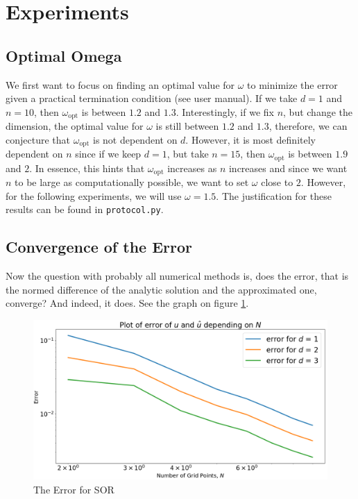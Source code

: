 \section{Experiments}
\subsection{Optimal Omega}

We first want to focus on finding an optimal value for \(\omega\) to minimize the error given a practical termination condition (see user manual). If we take \(d = 1\) and \(n = 10\), then \(\omega_{\text{opt}}\) is between \(1.2\) and \(1.3\). Interestingly, if we fix \(n\), but change the dimension, the optimal value for \(\omega\) is still between \(1.2\) and \(1.3\), therefore, we can conjecture that \(\omega_\text{opt}\) is not dependent on \(d\). However, it is most definitely dependent on \(n\) since if we keep \(d = 1\), but take \(n = 15\), then \(\omega_{\text{opt}}\) is between \(1.9\) and \(2\).
In essence, this hints that \(\omega_\text{opt}\) increases as \(n\) increases and since we want \(n\) to be large as computationally possible, we want to set \(\omega\) close to \(2\). However, for the following experiments, we will use \(\omega = 1.5\). The justification for these results can be found in \texttt{protocol.py}.

\subsection{Convergence of the Error}

Now the question with probably all numerical methods is, does the error, that is the normed difference of the analytic solution and the approximated one, converge? And indeed, it does. See the graph on figure \ref{fig:boat1}.

\begin{figure}[h]
	\includegraphics[width=\linewidth]{graphics/error_plot_sor.png}
	\caption{The Error for SOR}
	\label{fig:boat1}
\end{figure}

